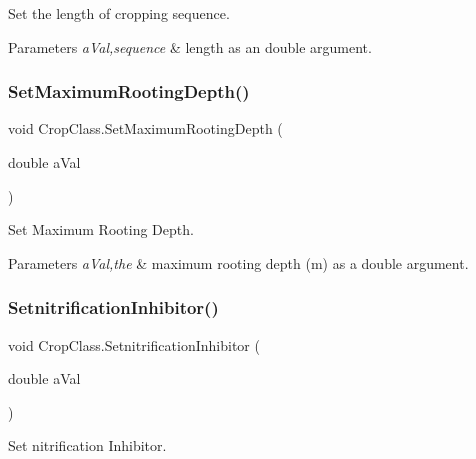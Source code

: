 Set the length of cropping sequence. 


\begin{DoxyParams}{Parameters}
{\em a\+Val,sequence} & length as an double argument. \\
\hline
\end{DoxyParams}
\mbox{\label{class_crop_class_ae211dd0ead3203552c3228e53d390441}} 
\subsubsection{\texorpdfstring{SetMaximumRootingDepth()}{SetMaximumRootingDepth()}}
{\footnotesize\ttfamily void Crop\+Class.\+Set\+Maximum\+Rooting\+Depth (\begin{DoxyParamCaption}\item[{double}]{a\+Val }\end{DoxyParamCaption})\hspace{0.3cm}{\ttfamily [inline]}}



Set Maximum Rooting Depth. 


\begin{DoxyParams}{Parameters}
{\em a\+Val,the} & maximum rooting depth (m) as a double argument. \\
\hline
\end{DoxyParams}
\mbox{\label{class_crop_class_a0178d9141992bca14d294e72061aa314}} 
\subsubsection{\texorpdfstring{SetnitrificationInhibitor()}{SetnitrificationInhibitor()}}
{\footnotesize\ttfamily void Crop\+Class.\+Setnitrification\+Inhibitor (\begin{DoxyParamCaption}\item[{double}]{a\+Val }\end{DoxyParamCaption})\hspace{0.3cm}{\ttfamily [inline]}}



Set nitrification Inhibitor. 


